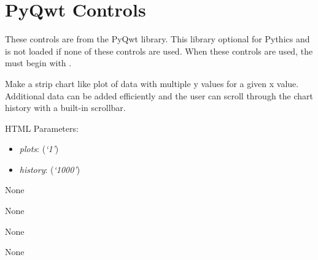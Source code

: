 \documentclass[letterpaper,10pt,english]{sphinxmanual}
\begin{document}
\section{PyQwt Controls}
\label{api:pyqwt-controls}
These controls are from the PyQwt library. This library optional for Pythics
and is not loaded if none of these controls are used. When these controls are
used, the  must begin with .
\label{api:module-qwt}

\begin{fulllineitems}
\label{api:qwt.Chart}
Make a strip chart like plot of data with multiple y values for a given
x value. Additional data can be added efficiently and the user can scroll
through the chart history with a built-in scrollbar.

HTML Parameters:
\begin{itemize}
\item {} 
\emph{plots}: (\emph{`1'})

\item {} 
\emph{history}: (\emph{`1000'})

\end{itemize}

\begin{fulllineitems}
\label{api:qwt.Chart.append}
None

\end{fulllineitems}


\begin{fulllineitems}
\label{api:qwt.Chart.append_array}
None

\end{fulllineitems}


\begin{fulllineitems}
\label{api:qwt.Chart.clear}
None

\end{fulllineitems}


\begin{fulllineitems}
\label{api:qwt.Chart.curves_per_plot}
None


\end{fulllineitems}
\end{fulllineitems}
\end{document}
